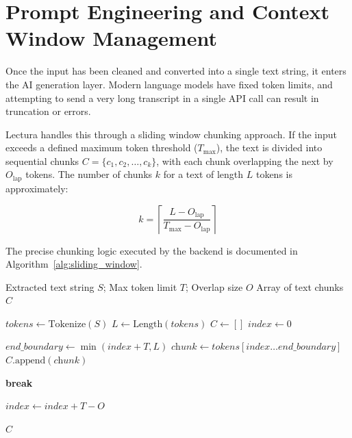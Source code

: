 \section{Prompt Engineering and Context Window Management}
Once the input has been cleaned and converted into a single text string, it enters the AI generation layer. Modern language models have fixed token limits, and attempting to send a very long transcript in a single API call can result in truncation or errors.

Lectura handles this through a sliding window chunking approach. If the input exceeds a defined maximum token threshold ($T_{\max}$), the text is divided into sequential chunks $C = \{c_1, c_2, \dots, c_k\}$, with each chunk overlapping the next by $O_{\text{lap}}$ tokens. The number of chunks $k$ for a text of length $L$ tokens is approximately:

\begin{equation}
    k = \left\lceil \frac{L - O_{\text{lap}}}{T_{\max} - O_{\text{lap}}} \right\rceil
\end{equation}

The precise chunking logic executed by the backend is documented in Algorithm~\ref{alg:sliding_window}.

\begin{algorithm}[htbp]
\caption{Sliding Window Context Overlap Extraction}
\label{alg:sliding_window}
\begin{algorithmic}[1]
    \REQUIRE Extracted text string $S$; Max token limit $T$; Overlap size $O$
    \ENSURE Array of text chunks $C$
    
    \STATE $\textit{tokens} \leftarrow \text{Tokenize}(S)$
    \STATE $L \leftarrow \text{Length}(\textit{tokens})$
    \STATE $C \leftarrow [ ]$
    \STATE $\textit{index} \leftarrow 0$
    
        \STATE $\textit{end\_boundary} \leftarrow \min(\textit{index} + T, L)$
        \STATE $\textit{chunk} \leftarrow \textit{tokens}[\textit{index} \dots \textit{end\_boundary}]$
        \STATE $C\text{.append}(\textit{chunk})$
        
            \STATE \textbf{break}
        \ENDIF
        
        \STATE $\textit{index} \leftarrow \textit{index} + T - O$ 
    \ENDWHILE
    
    \RETURN $C$
\end{algorithmic}
\end{algorithm}

